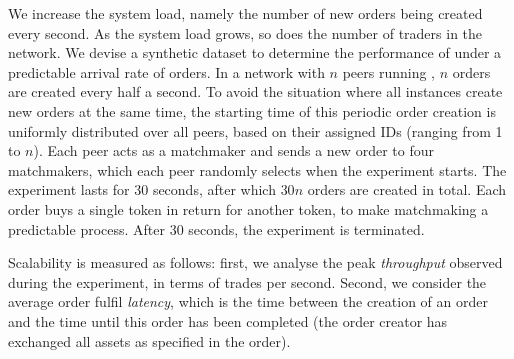 We increase the system load, namely the number of new orders being created every second.
As the system load grows, so does the number of traders in the network.
We devise a synthetic dataset to determine the performance of \ModelName{} under a predictable arrival rate of orders.
In a network with $ n $ peers running \ModelName{}, $ n $ orders are created every half a second.
To avoid the situation where all instances create new orders at the same time, the starting time of this periodic order creation is uniformly distributed over all peers, based on their assigned IDs (ranging from 1 to $ n $).
Each peer acts as a matchmaker and sends a new order to four matchmakers, which each peer randomly selects when the experiment starts.
The experiment lasts for 30 seconds, after which $ 30n $ orders are created in total.
Each order buys a single token in return for another token, to make matchmaking a predictable process.
After 30 seconds, the experiment is terminated.

Scalability is measured as follows:
first, we analyse the peak \emph{throughput} observed during the experiment, in terms of trades per second.
Second, we consider the average order fulfil \emph{latency}, which is the time between the creation of an order and the time until this order has been completed (the order creator has exchanged all assets as specified in the order).

